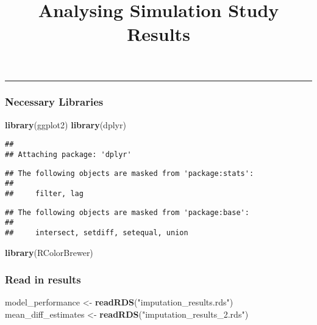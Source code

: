 \documentclass[]{article}
\title{Analysing Simulation Study Results}
\author{}
\date{\vspace{-2.5em}}
\newenvironment{Shaded}{\begin{snugshade}}{\end{snugshade}}
\newcommand{\KeywordTok}[1]{\textcolor[rgb]{0.13,0.29,0.53}{\textbf{#1}}}
\newcommand{\NormalTok}[1]{#1}
\newcommand{\StringTok}[1]{\textcolor[rgb]{0.31,0.60,0.02}{#1}}
\begin{document}
\maketitle

\begin{center}\rule{0.5\linewidth}{0.5pt}\end{center}

\hypertarget{necessary-libraries}{%
\subsubsection{Necessary Libraries}\label{necessary-libraries}}

\begin{Shaded}
\begin{Highlighting}[]
\KeywordTok{library}\NormalTok{(ggplot2)}
\KeywordTok{library}\NormalTok{(dplyr)}
\end{Highlighting}
\end{Shaded}

\begin{verbatim}
## 
## Attaching package: 'dplyr'
\end{verbatim}

\begin{verbatim}
## The following objects are masked from 'package:stats':
## 
##     filter, lag
\end{verbatim}

\begin{verbatim}
## The following objects are masked from 'package:base':
## 
##     intersect, setdiff, setequal, union
\end{verbatim}

\begin{Shaded}
\begin{Highlighting}[]
\KeywordTok{library}\NormalTok{(RColorBrewer)}
\end{Highlighting}
\end{Shaded}

\hypertarget{read-in-results}{%
\subsubsection{Read in results}\label{read-in-results}}

\begin{Shaded}
\begin{Highlighting}[]
\NormalTok{model_performance <-}\StringTok{ }\KeywordTok{readRDS}\NormalTok{(}\StringTok{"imputation_results.rds"}\NormalTok{)}
\NormalTok{mean_diff_estimates <-}\StringTok{ }\KeywordTok{readRDS}\NormalTok{(}\StringTok{"imputation_results_2.rds"}\NormalTok{)}
\end{Highlighting}
\end{Shaded}
\end{document}
